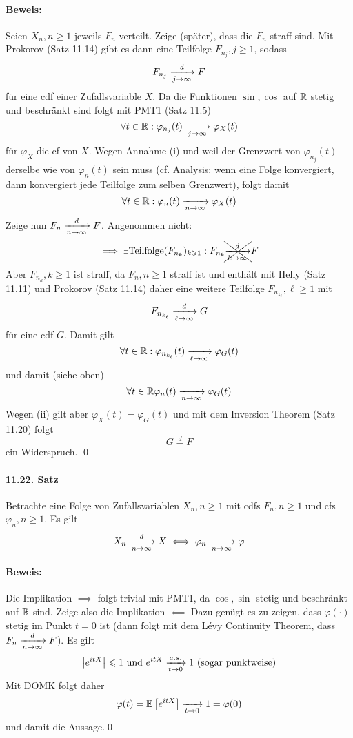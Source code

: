 \documentclass[11pt]{report}
\begin{document}
\paragraph{Beweis:}Seien $X_n,n\geq1$ jeweils $F_n$-verteilt. Zeige (sp\"ater), dass die $F_n$ straff sind.
Mit Prokorov (Satz 11.14) gibt es dann eine Teilfolge $F_{n_j},j\geq1$, sodass
$$F_{n_j}\nto{d}{j\to\infty}F$$
f\"ur eine cdf einer Zufallsvariable $X$. Da die Funktionen $\sin,\cos$ auf $\mathbb{R}$ stetig und beschr\"ankt sind folgt mit PMT1 (Satz 11.5)
$$\forall t\in\R:\varphi_{n_j}(t)\nto{}{j\to\infty}\varphi_X(t)$$
f\"ur $\varphi_X$ die cf von $X$. Wegen Annahme (i) und weil der Grenzwert von $\varphi_{n_j}(t)$ derselbe wie von $\varphi_n(t)$ sein muss (cf. Analysis: wenn eine Folge konvergiert, dann konvergiert jede Teilfolge zum selben Grenzwert), folgt damit
$$\forall t\in\R:\varphi_n(t)\nto{}{n\to\infty}\varphi_X(t)$$
Zeige nun $F_n\nto{d}{n\to\infty}F$. Angenommen nicht: 
$$\implies\exists\text{Teilfolge} (F_{n_k})_{k\geq1}:F_{n_k}\xcancel{\nto{d}{k\to\infty}}F$$
Aber $F_{n_k},k\geq1$ ist straff, da $F_n,n\geq1$ straff ist und enth\"alt mit Helly (Satz 11.11) und Prokorov (Satz 11.14) daher eine weitere Teilfolge $F_{n_{k_\ell}},\ell\geq1$ mit 
$$F_{n_{k_\ell}}\nto{d}{\ell\to\infty}G$$
f\"ur eine cdf $G$. Damit gilt
$$\forall t\in\R:\varphi_{n_{k_\ell}}(t)\nto{}{\ell\to\infty}\varphi_G(t)$$
und damit (siehe oben) 
$$\forall t\in\R\varphi_n(t)\nto{}{n\to\infty}\varphi_G(t)$$
Wegen (ii) gilt aber $\varphi_X(t)=\varphi_G(t)$ und mit dem Inversion Theorem (Satz 11.20) folgt
$$G\overset{d}{=}F$$
ein Widerspruch. \qed

\paragraph{11.22. Satz}Betrachte eine Folge von Zufallsvariablen $X_n,n\geq1$ mit cdfs $F_n,n\geq1$ und cfs $\varphi_n,n\geq1$. Es gilt
$$X_n\nto{d}{n\to\infty}X\iff\varphi_n\nto{}{n\to\infty}\varphi$$

\paragraph{Beweis:}Die Implikation $\implies$ folgt trivial mit PMT1, da $\cos,\sin$ stetig und beschr\"ankt auf $\mathbb{R}$ sind.
Zeige also die Implikation $\impliedby$\newline
 Dazu gen\"ugt es zu zeigen, dass $\varphi(\cdot)$ stetig im Punkt $t=0$ ist (dann folgt mit dem L\'evy Continuity Theorem, dass $F_n\nto{d}{n\to\infty}F$). Es gilt
 $$\left|e^{itX}\right|\leq1 \text{ und }e^{itX}\nto{a.s.}{t\to0}1\text{ (sogar punktweise)}$$
 Mit DOMK folgt daher
 $$\varphi(t)=\E \left[e^{itX}\right]\nto{}{t\to0}1=\varphi(0)$$
 und damit die Aussage.\qed
 
\end{document}
